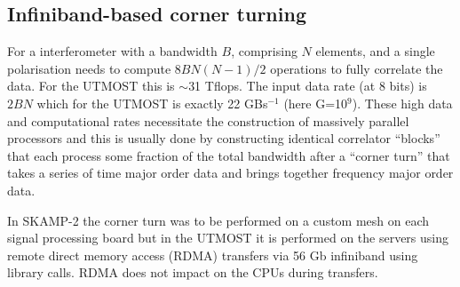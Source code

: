 \subsection{Infiniband-based corner turning}
For a interferometer with a bandwidth $B$, comprising $N$ elements, and a single polarisation needs to compute $8BN(N-1)/2$ operations to fully correlate the data. For the UTMOST this is $\sim$31 Tflops. The input data rate (at 8 bits) is $2BN$ which for the UTMOST is exactly 22 GBs$^{-1}$ (here G=10$^9$). These high data and computational rates necessitate the construction of massively parallel processors and this is usually done by constructing identical correlator ``blocks'' that each process some fraction of the total bandwidth after a ``corner turn'' that takes a series of time major order data and brings together frequency major order data.

In SKAMP-2 the corner turn was to be performed on a custom mesh on each signal processing board but in the UTMOST it is performed on the servers using remote direct memory access (RDMA) transfers via 56 Gb infiniband using library calls. RDMA does not impact on the CPUs during transfers.
